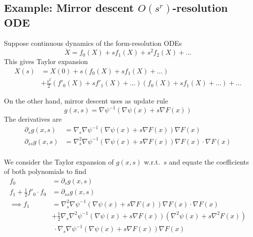 \documentclass[main.tex]{subfiles}
\begin{document}
\cite{luResolutionODEFramework2021}
\subsection{Example: Mirror descent $O(s^r)$-resolution ODE}
Suppose continuous dynamics of the form-resolution ODEs
\[ \dot X = f_0(X) + sf_1(X) + s^2f_2(X) + \dots \]
This gives Taylor expansion
\begin{align*}
	X(s) & = X(0) + s(f_0(X) + sf_1(X) + \dots)                                          \\
	     & + \frac{s^2}{2}(f'_0(X) + sf'_1(X) + \dots)(f_0(X) + sf_1(X) + \dots) + \dots
\end{align*}\label{eq:taylor-x}

On the other hand, mirror descent uses as update rule
\[ g(x, s) = \nabla\psi^{-1}(\nabla\psi(x) + s \nabla F(x)) \]
The derivatives are
\begin{align*}
	\partial_s g(x, s)    & = \nabla_s \nabla \psi^{-1}(\nabla\psi(x) + s \nabla F(x))\nabla F(x)                      \\
	\partial_{ss} g(x, s) & = \nabla^2_s \nabla \psi^{-1}(\nabla\psi(x) + s \nabla F(x)) \nabla F(x) \cdot \nabla F(x) \\
\end{align*}

We consider the Taylor expansion of $g(x,s)$ w.r.t.\ $s$ and equate the coefficients of both polynomials to find
\begin{align*}
	f_0                             & = \partial_s g(x,s)                                                                                         \\
	f_1 + \frac{1}{2}f'_0 \cdot f_0 & = \partial_{ss} g(x,s)                                                                                      \\
	\implies f_1                    & = \nabla^2_s \nabla \psi^{-1}(\nabla\psi(x) + s \nabla F(x)) \nabla F(x) \cdot \nabla F(x)                  \\
	                                & + \frac{1}{2}\nabla_s \nabla^2 \psi^{-1}(\nabla \psi (x) + s \nabla F(x))(\nabla^2 \psi(x) + s\nabla^2F(x)) \\
	                                & \ \cdot  \nabla_s \nabla \psi^{-1}(\nabla\psi(x) + s \nabla F(x))\nabla F(x)
\end{align*}
\end{document}
